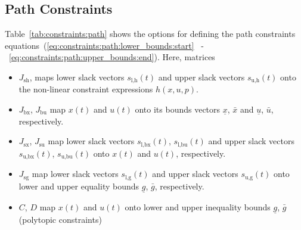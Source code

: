 \documentclass[english]{article}
\newcommand{\ind}[1]{_{\textrm{#1}}}
\begin{document}
\subsection{Path Constraints}\label{sec:constraints:path}
%
Table~\ref{tab:constraints:path} shows the options for defining the path constraints equations~(\ref{eq:constraints:path:lower_bounds:start} ~-~\ref{eq:constraints:path:upper_bounds:end}).
Here, matrices
\begin{itemize}
    \item $J\ind{sh}$, maps lower slack vectors $s\ind{l,h}(t)$ and upper slack vectors $s\ind{u,h}(t)$ onto the non-linear constraint expressions $h(x,u,p)$.
    \item $J\ind{bx}$, $J\ind{bu}$ map $x(t)$ and $u(t)$ onto its bounds vectors $\underline{x}$, $\bar{x}$ and $\underline{u}$, $\bar{u}$, respectively.
    \item $J\ind{sx}$, $J\ind{su}$ map lower slack vectors $s\ind{l,bx}(t)$, $s\ind{l,bu}(t)$ and upper slack vectors $s\ind{u,bx}(t)$, $s\ind{u,bu}(t)$ onto $x(t)$ and $u(t)$, respectively.
    \item $J\ind{sg}$ map lower slack vectors $s\ind{l,g}(t)$ and upper slack vectors $s\ind{u,g}(t)$ onto lower and upper equality bounds $\underline{g}$, $\bar{g}$, respectively.
    \item $C$, $D$ map $x(t)$ and $u(t)$ onto lower and upper inequality bounds $\underline{g}$, $\bar{g}$ (polytopic constraints)
\end{itemize}
%
\end{document}
